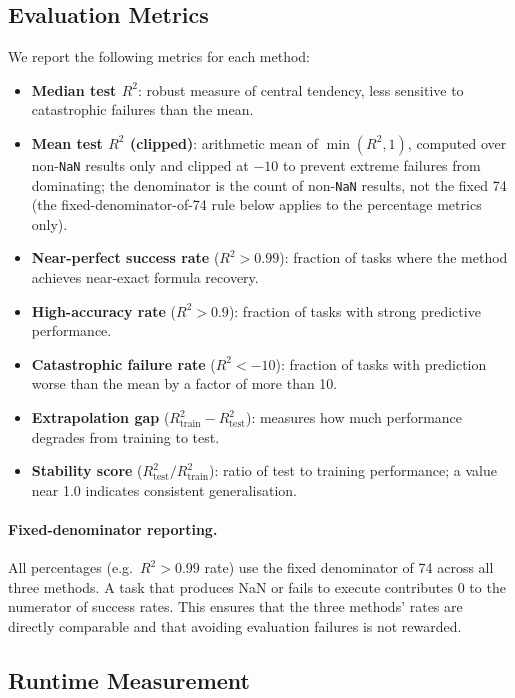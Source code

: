 \documentclass[twoside,11pt]{article}
\newcommand{\Rsq}{R^{2}}
\newcommand{\Rtrain}{R^{2}_{\mathrm{train}}}
\newcommand{\Rtest}{R^{2}_{\mathrm{test}}}
\begin{document}
\subsection{Evaluation Metrics}\label{subsec:evaluation-metrics}
\label{sec:setup_metrics}

We report the following metrics for each method:
\begin{itemize}
  \item \textbf{Median test $\Rsq$}: robust measure of central tendency, less
    sensitive to catastrophic failures than the mean.
  \item \textbf{Mean test $\Rsq$ (clipped)}: arithmetic mean of $\min(\Rsq, 1)$,
    computed over non-\texttt{NaN} results only and clipped at $-10$ to prevent extreme failures from
    dominating; the denominator is the count of non-\texttt{NaN} results, not the fixed 74 (the fixed-denominator-of-74 rule below
    applies to the percentage metrics only).
  \item \textbf{Near-perfect success rate} ($\Rsq > 0.99$): fraction of tasks where
    the method achieves near-exact formula recovery.
  \item \textbf{High-accuracy rate} ($\Rsq > 0.9$): fraction of tasks with strong
    predictive performance.
  \item \textbf{Catastrophic failure rate} ($\Rsq < -10$): fraction of tasks with
    prediction worse than the mean by a factor of more than 10.
  \item \textbf{Extrapolation gap} ($\Rtrain - \Rtest$): measures how much
    performance degrades from training to test.
  \item \textbf{Stability score} ($\Rtest / \Rtrain$): ratio of test to training
    performance; a value near 1.0 indicates consistent generalisation.
\end{itemize}

\paragraph{Fixed-denominator reporting.}
All percentages (e.g.\ $\Rsq > 0.99$ rate) use the fixed denominator of 74 across
all three methods.  A task that produces NaN or fails to execute contributes 0 to
the numerator of success rates.  This ensures that the three methods' rates are
directly comparable and that avoiding evaluation failures is not rewarded.

\subsection{Runtime Measurement}\label{subsec:runtime-measurement}
\label{sec:timing_setup}
\end{document}
